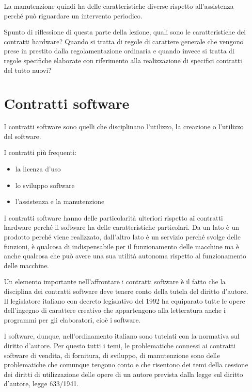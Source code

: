 La manutenzione quindi ha delle caratteristiche diverse rispetto all'assistenza perché può riguardare un intervento periodico. 

Spunto di riflessione di questa parte della lezione, quali sono le caratteristiche dei contratti hardware? Quando si tratta di regole di carattere generale che vengono prese in prestito dalla regolamentazione ordinaria e quando invece si tratta di regole specifiche elaborate con riferimento alla realizzazione di specifici contratti del tutto nuovi? 

\section{Contratti software}

I contratti software sono quelli che disciplinano l'utilizzo, la creazione o l'utilizzo del software. 

I contratti più frequenti: 
\begin{itemize}
    \item la licenza d'uso
    \item lo sviluppo software
    \item l'assistenza e la manutenzione
\end{itemize}

I contratti software hanno delle particolarità ulteriori rispetto ai contratti hardware perché il software ha delle caratteristiche particolari. Da un lato è un prodotto perché viene realizzato, dall'altro lato è un servizio perché svolge delle funzioni, è qualcosa di indispensabile per il funzionamento delle macchine ma è anche qualcosa che può avere una sua utilità autonoma rispetto al funzionamento delle macchine. 

Un elemento importante nell'affrontare i contratti software è il fatto che la disciplina dei contratti software deve tenere conto della tutela del diritto d'autore. Il legislatore italiano con decreto legislativo del 1992 ha equiparato tutte le opere dell'ingegno di carattere creativo che appartengono alla letteratura anche i programmi per gli elaboratori, cioè i software. 

I software, dunque, nell'ordinamento italiano sono tutelati con la normativa sul diritto d'autore. Per questo tutti i temi, le problematiche connessi ai contratti software di vendita, di fornitura, di sviluppo, di manutenzione sono delle problematiche che comunque tengono conto e che risentono dei temi della cessione dei diritti di utilizzazione delle opere di un autore prevista dalla legge sul diritto d'autore, legge 633/1941. 

